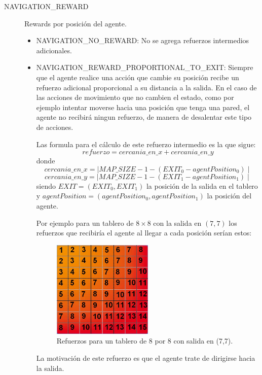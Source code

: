 \documentclass[a4paper,spanish] {article}
\begin{document}
\begin{description}
\item[NAVIGATION\_REWARD] Rewards por posici\'on del agente.
	\begin{itemize}
	\item NAVIGATION\_NO\_REWARD: No se agrega refuerzos intermedios adicionales.
	\item NAVIGATION\_REWARD\_PROPORTIONAL\_TO\_EXIT: Siempre que el agente realice una acci\'on que cambie su posici\'on recibe un refuerzo adicional proporcional a su distancia a la salida. En el caso de las acciones de movimiento que no cambien el estado, como por ejemplo intentar moverse hacia una posici\'on que tenga una pared, el agente no recibir\'a ningun refuerzo, de manera de desalentar este tipo de acciones. 
	
	Las formula para el c\'alculo de este refuerzo intermedio es la que sigue:
	$$ refuerzo = cercania\_en\_x + cercania\_en\_y $$
	donde
	$$ cercania\_en\_x =\mid MAP\_SIZE-1 -(EXIT_0 - agentPosition_0) \mid$$
	$$ cercania\_en\_y =\mid MAP\_SIZE-1 -(EXIT_1 - agentPosition_1) \mid$$
	siendo $EXIT = (EXIT_0, EXIT_1)$ la posici\'on de la salida en el tablero
	y $agentPosition= (agentPosition_0, agentPosition_1)$ la posici\'on del agente.
	
	Por ejemplo para un tablero de $8 \times 8$ con la salida en $(7,7)$ los refuerzos que recibir\'ia el agente al llegar a cada posici\'on ser\'ian estos:
	\begin{figure}[h!]
  \centering
    \includegraphics[width=0.5\textwidth]{refuerzos.jpg}
  \caption{Refuerzos para un tablero de 8 por 8 con salida en (7,7).}
	\end{figure}	
	La motivaci\'on de este refuerzo es que el agente trate de dirigirse hacia la salida.
	\end{itemize}


\end{description}
\end{document}
